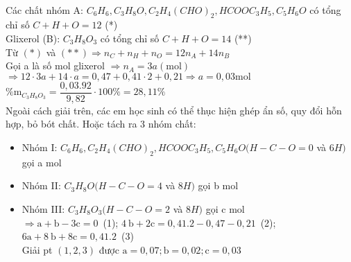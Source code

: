 \begin{vd}
{\begin{itemize}
				\\
				Các chất nhóm A: $C_6 H_6, C_3 H_8 O, C_2 H_4(CHO)_2, HCOOC_3 H_5, C_5 H_6 O$ có tổng chỉ số $C+H+O=12$ (*)
				\\
				Glixerol (B): $C_3 H_8 O_3$ có tổng chỉ số $C+H+O=14$ (**)
				\\
				Từ $(*)$ và $(* *) \Rightarrow n_C+n_H+n_O=12n_A+14n_B$
				\\
				Gọi a là số $\mathrm{mol}$ glixerol $\Rightarrow n_A=3a(\mathrm{mol})$
				$\Rightarrow 12\cdot 3a+14\cdot a=0,47+0,41\cdot 2+0,21\Rightarrow a=0,03\mathrm{mol}$
				\\
				$\% \mathrm{m}_{C_3 H_8 O_3}=\dfrac{0,03.92}{9,82} \cdot 100\%=28,11\%$
				\\
				 Ngoài cách giải trên, các em học sinh có thể thục hiện ghép ẩn số, quy đổi hỗn hợp, bỏ bót chất. Hoặc tách ra 3 nhóm chất:
					\begin{itemize}
						\item Nhóm I: $C_6 H_6, C_2 H_4(CHO)_2, HCOOC_3 H_5, C_5 H_6 O(H-C-O=0$ và $6H)$ gọi a mol
						\item Nhóm II: $C_3 H_8 O(H-C-O=4$ và $8H)$ gọi b mol
						\item Nhóm III: $C_3 H_8 O_3(H-C-O=2$ và $8H)$ gọi c mol
						\\
						$\Rightarrow \mathrm{a}+\mathrm{b}-3 \mathrm{c}=0$\ (1);
						$4 \mathrm{~b}+2 \mathrm{c}=0,41.2-0,47-0,21$\ (2);
						$6 \mathrm{a}+8 \mathrm{~b}+8 \mathrm{c}=0,41.2$\ (3)
						\\
						Giải pt $(1,2,3)$ được $\mathrm{a}=0,07 ; \mathrm{b}=0,02 ; \mathrm{c}=0,03$
					\end{itemize}
				\end{itemize}
	}
\end{vd}

